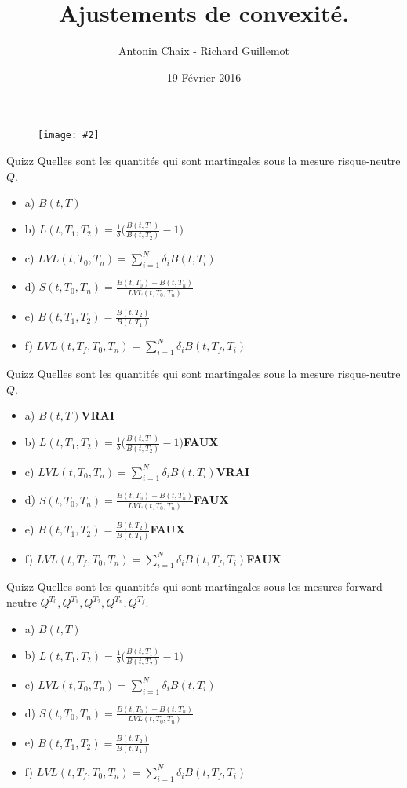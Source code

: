 \documentclass{beamer}
\title[Produits dérivés de taux]{Ajustements de convexité. }
\author{Antonin Chaix - Richard Guillemot}
\institute{Master IFMA}
\date{19 Février 2016}
\newcommand{\FIG}[2]{\texttt{[image: \#2]}}
\begin{document}
\begin{frame}
\titlepage
\begin{figure}[h]
\centering \FIG{5cm}{figures/UPMC_IFMA.jpg}
\end{figure}
\end{frame}

\begin{frame}{Quizz}
Quelles sont les quantités qui sont martingales sous la mesure risque-neutre $Q$.
\begin{itemize}
\item a) $B(t,T)$ 
\item b) $L(t,T_1,T_2)=\frac{1}{\delta}\big(\frac{B(t,T_1)}{B(t,T_2)}-1 \big)$
\item c) $\displaystyle LVL(t,T_0,T_n)=\sum_{i=1}^{N}\delta_i B(t,T_i)$
\item d) $S(t,T_0,T_n)=\frac{B(t,T_0)-B(t,T_n)}{LVL(t,T_0,T_n)}$
\item e) $B(t,T_1,T_2)=\frac{B(t,T_2)}{B(t,T_1)}$
\item f) $\displaystyle LVL(t,T_f,T_0,T_n)=\sum_{i=1}^{N}\delta_i B(t,T_f,T_i)$
\end{itemize}
\end{frame}


\begin{frame}{Quizz}
Quelles sont les quantités qui sont martingales sous la mesure risque-neutre $Q$.
\begin{itemize}
\item a) $B(t,T)$\textbf{\color{green}VRAI} 
\item b) $L(t,T_1,T_2)=\frac{1}{\delta}\big(\frac{B(t,T_1)}{B(t,T_2)}-1 \big)$\textbf{\color{red}FAUX}
\item c) $\displaystyle LVL(t,T_0,T_n)=\sum_{i=1}^{N}\delta_i B(t,T_i)$\textbf{\color{green}VRAI}
\item d) $S(t,T_0,T_n)=\frac{B(t,T_0)-B(t,T_n)}{LVL(t,T_0,T_n)}$\textbf{\color{red}FAUX}
\item e) $B(t,T_1,T_2)=\frac{B(t,T_2)}{B(t,T_1)}$\textbf{\color{red}FAUX} 
\item f) $\displaystyle LVL(t,T_f,T_0,T_n)=\sum_{i=1}^{N}\delta_i B(t,T_f,T_i)$\textbf{\color{red}FAUX}
\end{itemize}
\end{frame}

\begin{frame}{Quizz}
Quelles sont les quantités qui sont martingales sous les mesures forward-neutre $Q^{T_0}, Q^{T_1},Q^{T_2}, Q^{T_n}, Q^{T_f}$.
\begin{itemize}
\item a) $B(t,T)$
\item b) $L(t,T_1,T_2)=\frac{1}{\delta}\big(\frac{B(t,T_1)}{B(t,T_2)}-1 \big)$
\item c) $\displaystyle LVL(t,T_0,T_n)=\sum_{i=1}^{N}\delta_i B(t,T_i)$
\item d) $S(t,T_0,T_n)=\frac{B(t,T_0)-B(t,T_n)}{LVL(t,T_0,T_n)}$
\item e) $B(t,T_1,T_2)=\frac{B(t,T_2)}{B(t,T_1)}$
\item f) $\displaystyle LVL(t,T_f,T_0,T_n)=\sum_{i=1}^{N}\delta_i B(t,T_f,T_i)$
\end{itemize}
\end{frame}
\end{document}
